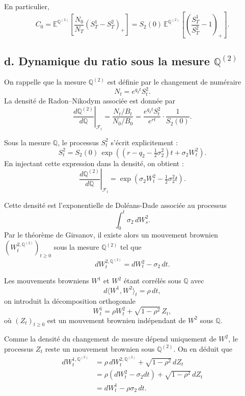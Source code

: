 En particulier,
\[
C_0
= \mathbb E^{\mathbb Q^{(2)}}\left[ \frac{N_0}{N_T} (S_T^1 - S_T^2)_+ \right]
= S_2(0)\,\mathbb E^{\mathbb Q^{(2)}}\left[ \left( \frac{S_T^1}{S_T^2} - 1 \right)_+ \right].
\]


\subsection*{d. Dynamique du ratio sous la mesure $\mathbb Q^{(2)}$}

On rappelle que la mesure $\mathbb Q^{(2)}$ est définie par le changement de numéraire
\[
N_t = e^{q_2 t} S_t^2.
\]
La densité de Radon--Nikodym associée est donnée par
\[
\left.\frac{d\mathbb Q^{(2)}}{d\mathbb Q}\right|_{\mathcal F_t}
= \frac{N_t / B_t}{N_0 / B_0}
= \frac{e^{q_2 t} S_t^2}{e^{rt}} \cdot \frac{1}{S_2(0)}.
\]

Sous la mesure $\mathbb Q$, le processus $S_t^2$ s’écrit explicitement :
\[
S_t^2 = S_2(0)\,
\exp\!\left(
\left(r - q_2 - \tfrac{1}{2}\sigma_2^2\right)t
+ \sigma_2 W_t^2
\right).
\]
En injectant cette expression dans la densité, on obtient :
\[
\left.\frac{d\mathbb Q^{(2)}}{d\mathbb Q}\right|_{\mathcal F_t}
=
\exp\!\left(
\sigma_2 W_t^2 - \tfrac{1}{2}\sigma_2^2 t
\right).
\]

Cette densité est l’exponentielle de Doléans-Dade associée au processus
\[
\int_0^t \sigma_2\, dW_s^2.
\]
Par le théorème de Girsanov, il existe alors un mouvement brownien
$(W_t^{2,\mathbb Q^{(2)}})_{t \ge 0}$ sous la mesure $\mathbb Q^{(2)}$ tel que
\[
\boxed{
dW_t^{2,\mathbb Q^{(2)}} = dW_t^2 - \sigma_2\,dt.
}
\]

\medskip

Les mouvements browniens $W^1$ et $W^2$ étant corrélés sous $\mathbb Q$ avec
\[
d\langle W^1, W^2 \rangle_t = \rho\,dt,
\]
on introduit la décomposition orthogonale
\[
W_t^1 = \rho W_t^2 + \sqrt{1-\rho^2}\, Z_t,
\]
où $(Z_t)_{t \ge 0}$ est un mouvement brownien indépendant de $W^2$ sous $\mathbb Q$.

Comme la densité du changement de mesure dépend uniquement de $W^2$, le processus
$Z_t$ reste un mouvement brownien sous $\mathbb Q^{(2)}$. On en déduit que
\[
\begin{aligned}
dW_t^{1,\mathbb Q^{(2)}}
&= \rho\, dW_t^{2,\mathbb Q^{(2)}} + \sqrt{1-\rho^2}\, dZ_t \\
&= \rho(dW_t^2 - \sigma_2 dt) + \sqrt{1-\rho^2}\, dZ_t \\
&= dW_t^1 - \rho\sigma_2\,dt.
\end{aligned}
\]

